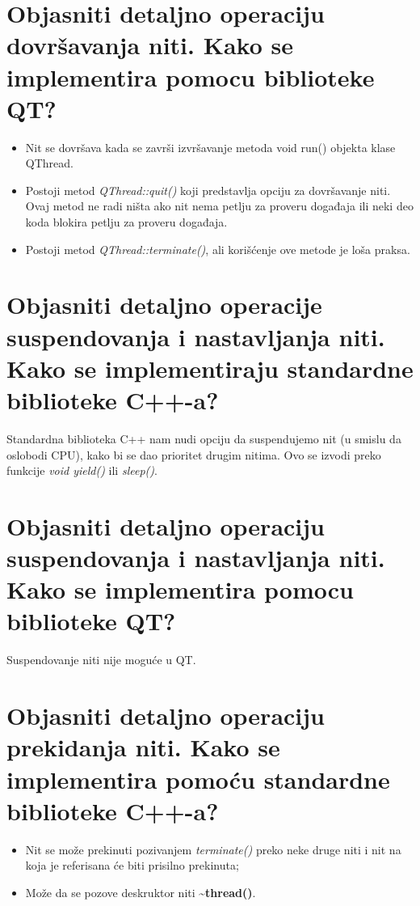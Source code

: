 \documentclass[a4paper]{article}
\begin{document}
\section{Objasniti detaljno operaciju dovršavanja niti. Kako se implementira pomocu biblioteke QT?}
  \begin{itemize}
    \item Nit se dovršava kada se završi izvršavanje metoda void run() objekta klase QThread.
    \item Postoji metod \textit{QThread::quit()} koji predstavlja opciju za dovršavanje niti.
          Ovaj metod ne radi ništa ako nit nema petlju za proveru događaja ili neki deo koda
          blokira petlju za proveru događaja.
    \item Postoji metod \textit{QThread::terminate()}, ali korišćenje ove metode je loša
          praksa.
  \end{itemize}
  

\section{Objasniti detaljno operacije suspendovanja i nastavljanja niti. Kako se implementiraju
         standardne biblioteke C++-a?}
  Standardna biblioteka C++ nam nudi opciju da suspendujemo nit (u smislu da oslobodi CPU),
  kako bi se dao prioritet drugim nitima. Ovo se izvodi preko funkcije \textit{void yield()}
  ili \textit{sleep()}. \cite{cppref_yield} 
  
\section{Objasniti detaljno operaciju suspendovanja i nastavljanja niti. 
         Kako se implementira pomocu biblioteke QT?}
  Suspendovanje niti nije moguće u QT.
  
\section{Objasniti detaljno operaciju prekidanja niti. Kako se implementira pomoću standardne
         biblioteke C++-a?}
  \begin{itemize}
    \item Nit se može prekinuti pozivanjem \textit{terminate()} preko neke druge niti i nit
          na koja je referisana će biti prisilno prekinuta;
    \item Može da se pozove deskruktor niti \textbf{\textasciitilde thread()}. 
  \end{itemize}
\end{document}
